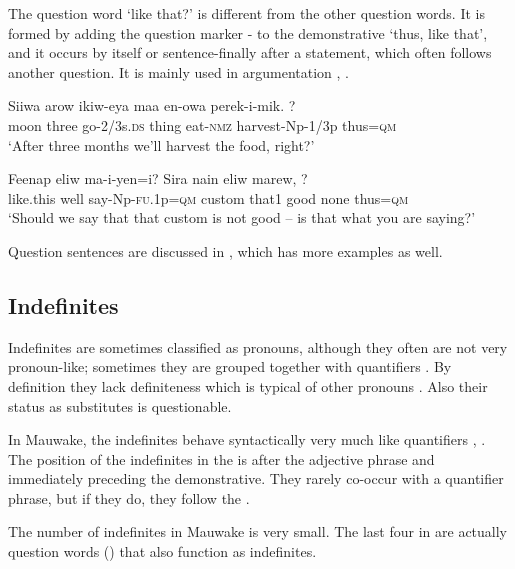 The question word  `like that?' is different from the other question words. It is formed by adding the question marker - to the demonstrative  `thus, like that', and it occurs by itself or sentence-finally after a statement, which often follows another question. It is mainly used in argumentation , . 

\ea%
\label{ex:3:x1194}
\gll Siiwa arow ikiw-eya maa en-owa perek-i-mik. ? \\
moon three go-2/3s.\textsc{ds} thing eat-\textsc{nmz} harvest-Np-1/3p thus=\textsc{qm}\\
\glt`After three months we'll harvest the food, right?'
\z

\ea%
\label{ex:3:x1195}
\gll Feenap eliw ma-i-yen=i? Sira nain eliw marew, ?\\
like.this well say-Np-\textsc{fu}.1p=\textsc{qm} custom that1 good none thus=\textsc{qm}\\
\glt`Should we say that that custom is not good -- is that what you are saying?'
\z

Question sentences are discussed in , which has more examples as well.

\subsection{Indefinites}\label{sec:3.7.2}
{}
Indefinites are sometimes classified as pronouns, although they often are not very pro\-noun-like; sometimes they are grouped together with quantifiers \citep[81]{HakulinenEtAl1979}%
. By definition they lack definiteness which is typical of other pronouns \citep[376]{QuirkEtAl1989}. Also their status as  substitutes is questionable.

In Mauwake, the indefinites behave syntactically very much like quantifiers , . The position of the indefinites in the  is after the adjective phrase and immediately preceding the demonstrative. They rarely co-occur with a quantifier phrase, but if they do, they follow the .

The number of indefinites in Mauwake is very small. The last four in  are actually question words () that also function as indefinites.

